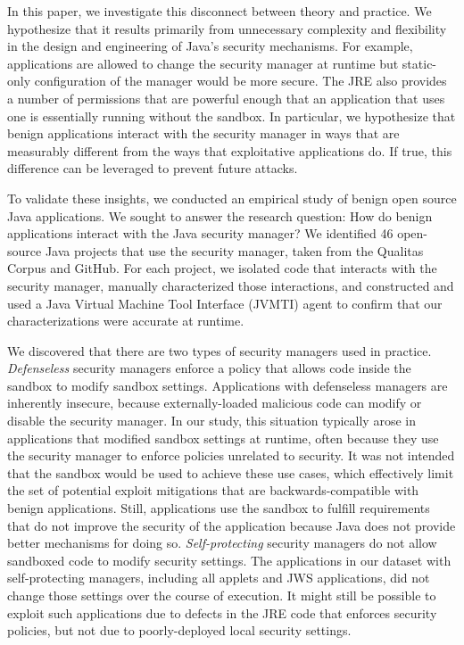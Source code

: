 \documentclass{sig-alternate}
\begin{document}
In this paper, we investigate this disconnect between theory and practice.  We
hypothesize that it results primarily from unnecessary complexity and flexibility
in the design and engineering of Java's security mechanisms.   For example, applications are allowed to change the security manager at runtime but static-only configuration of the manager would be more secure. The JRE also provides a number of permissions that are powerful enough that an application that uses one is essentially running without the sandbox. In particular, we
hypothesize that benign applications interact with the security manager in ways
that are measurably different from the ways that exploitative applications do.  
If true, this difference can be leveraged to prevent future attacks.

To validate these insights, we conducted an empirical study of benign open
source Java applications.  We sought to answer the research question: How do benign
applications interact with the Java security manager?  We identified 46
open-source Java projects that use the security manager, taken from the Qualitas
Corpus \cite{QualitasCorpus:APSEC:2010} and GitHub. For each project, we
isolated code that interacts with the security manager, manually characterized
those interactions, and constructed and used a Java Virtual Machine Tool Interface (JVMTI) agent
to confirm that our characterizations were accurate at runtime.

We discovered that there are two types of security managers used in
practice. \emph{Defenseless} security managers enforce a policy that allows code
inside the sandbox to modify sandbox settings.  Applications with defenseless
managers are inherently insecure, because externally-loaded malicious code can
modify or disable the security manager.  In our study, this situation typically
arose in applications that modified sandbox settings at runtime, often because
they use the security manager to enforce policies unrelated to security.
 It was not intended that the sandbox would be used to achieve these use cases, which effectively limit the set of potential exploit mitigations that are backwards-compatible with benign applications. Still, applications use the sandbox to fulfill requirements that do not improve the security of the application because Java does not provide better mechanisms for doing so. 
\emph{Self-protecting} security managers do not allow sandboxed code to modify
security settings.  The applications in our dataset with self-protecting
managers, including all applets and JWS applications, did not change those
settings over the course of execution.  It might still be possible to exploit
such applications due to defects in the JRE code that enforces security
policies, but not due to poorly-deployed local security settings.
\end{document}
